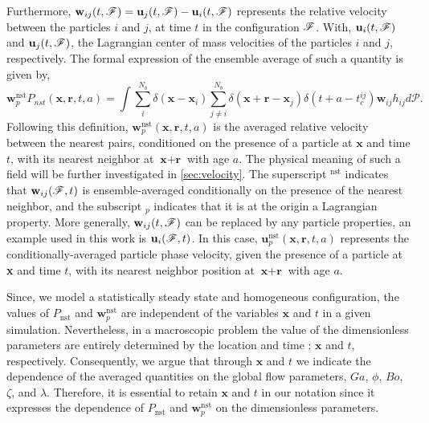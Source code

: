 Furthermore, $\textbf{w}_{ij}(t,\mathscr{F}) = \textbf{u}_j(t,\mathscr{F}) - \textbf{u}_i(t,\mathscr{F})$ represents the relative velocity between the particles $i$ and $j$, at time $t$ in the configuration $\mathscr{F}$. 
With, $\textbf{u}_i(t,\mathscr{F})$ and $\textbf{u}_j(t,\mathscr{F})$, the Lagrangian center of mass velocities of the particles $i$ and $j$, respectively. 
The formal expression of the ensemble average of such a quantity is given by,
\begin{equation*}
    \textbf{w}^\text{nst}_p P_{nst}(\textbf{x},\textbf{r},t,a)
    = 
    \int \sum_{i}^{N_b}\delta(\textbf{x}-\textbf{x}_i)
    \sum_{j\neq i}^{N_b}\delta(\textbf{x}+\textbf{r}-\textbf{x}_j) 
    \delta(t+a-t_c^{ij}) 
    \textbf{w}_{ij}
    h_{ij} 
    d\mathscr{P}.
    \label{eq:q_nstij}
\end{equation*}
Following this definition, $\textbf{w}^\text{nst}_p(\textbf{x},\textbf{r},t,a)$ is the averaged relative velocity between the nearest pairs, conditioned on the presence of a particle at $\textbf{x}$ and time $t$, with its nearest neighbor at $\textbf{x}+\textbf{r}$ with age $a$. 
The physical meaning of such a field will be further investigated in \ref{sec:velocity}. 
The superscript $^\text{nst}$ indicates that $\textbf{w}_{ij}(\mathscr{F},t)$ is ensemble-averaged conditionally on the presence of the nearest neighbor, and the subscript $_p$ indicates that it is at the origin a Lagrangian property. 
More generally, $\textbf{w}_{ij}(t,\mathscr{F})$ can be replaced by any particle properties, an example used in this work is $\textbf{u}_i(\mathscr{F},t)$.
In this case, $\textbf{u}^\text{nst}_p(\textbf{x},\textbf{r},t,a)$ represents the conditionally-averaged particle phase velocity, given the presence of a particle at \textbf{x} and time $t$, with its nearest neighbor position at $\textbf{x}+\textbf{r}$ with age $a$. 

Since, we model a statistically steady state and homogeneous configuration, the values of $P_\text{nst}$ and $\textbf{w}^\text{nst}_p$ are independent of the variables $\mathbf{x}$ and $t$ in a given simulation. 
Nevertheless, in a macroscopic problem the value of the dimensionless parameters are entirely determined by the location and time : $\textbf{x}$ and $t$, respectively. 
Consequently, we argue that through $\mathbf{x}$ and $t$ we indicate the dependence of the averaged quantities on the global flow parameters, $Ga$, $\phi$, $Bo$, $\zeta$, and $\lambda$.
Therefore, it is essential to retain $\mathbf{x}$ and $t$ in our notation since it expresses the dependence of $P_\text{nst}$ and $\textbf{w}^\text{nst}_p$ on the dimensionless parameters. 



